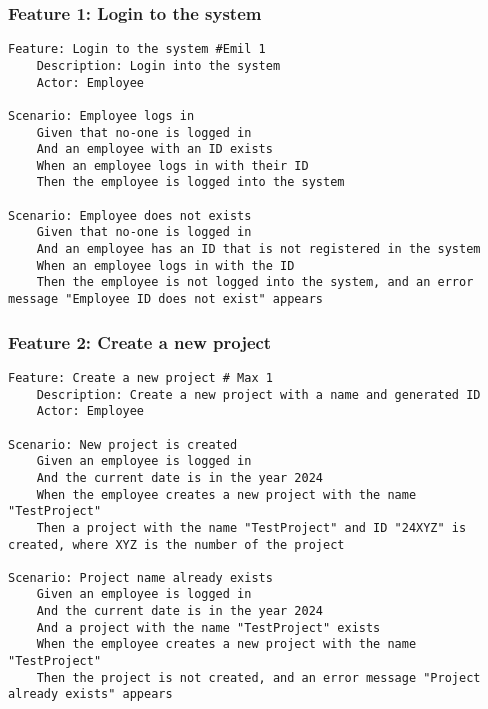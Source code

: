 


\subsubsection{Feature 1: Login to the system} %
\begin{lstlisting} 
Feature: Login to the system #Emil 1
    Description: Login into the system
    Actor: Employee

Scenario: Employee logs in
    Given that no-one is logged in
    And an employee with an ID exists
    When an employee logs in with their ID
    Then the employee is logged into the system

Scenario: Employee does not exists
    Given that no-one is logged in
    And an employee has an ID that is not registered in the system
    When an employee logs in with the ID
    Then the employee is not logged into the system, and an error message "Employee ID does not exist" appears
\end{lstlisting}

\subsubsection{Feature 2: Create a new project}%
\begin{lstlisting}
Feature: Create a new project # Max 1
    Description: Create a new project with a name and generated ID
    Actor: Employee

Scenario: New project is created
    Given an employee is logged in
    And the current date is in the year 2024
    When the employee creates a new project with the name "TestProject"
    Then a project with the name "TestProject" and ID "24XYZ" is created, where XYZ is the number of the project

Scenario: Project name already exists
    Given an employee is logged in
    And the current date is in the year 2024
    And a project with the name "TestProject" exists
    When the employee creates a new project with the name "TestProject"
    Then the project is not created, and an error message "Project already exists" appears
\end{lstlisting}

